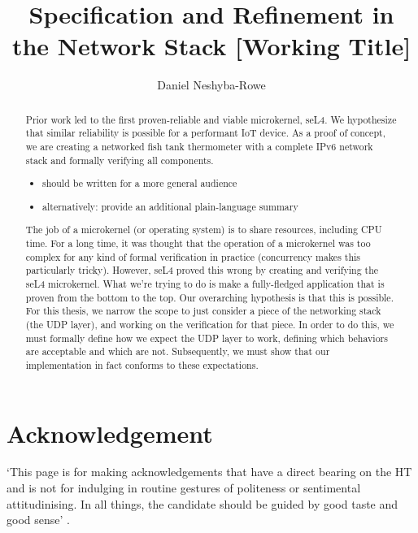 \documentclass[twoside]{memoir}
\title{Specification and Refinement in the Network Stack [Working Title]} %
\author{Daniel Neshyba-Rowe}
\begin{document}
\frontmatter


\maketitle

\chapter{Acknowledgement}
`This page is for making acknowledgements that have a direct bearing on the HT and is not for indulging in routine gestures of politeness or sentimental attitudinising. In all things, the candidate should be guided by good taste and good sense' . %

\begin{abstract}
        Prior work led to the first proven-reliable and viable microkernel, seL4.
      We hypothesize that similar reliability is possible for a performant IoT device.
      As a proof of concept, we are creating a networked fish tank thermometer
      with a complete IPv6 network stack and formally verifying all components.

      \begin{itemize}
          \item should be written for a more general audience
          \item alternatively: provide an additional plain-language summary
      \end{itemize}
      The job of a microkernel (or operating system) is to share resources, including CPU time.
      For a long time, it was thought that the operation of a microkernel was too complex for
      any kind of formal verification in practice (concurrency makes this particularly tricky).
      However, seL4 proved this wrong by creating and verifying the seL4 microkernel.
      What we're trying to do is make a fully-fledged application that is proven from the bottom to the top.
      Our overarching hypothesis is that this is possible.
      For this thesis, we narrow the scope to just consider a piece of the networking stack (the UDP layer), and working on the verification for that piece.
      In order to do this, we must formally define how we expect the UDP layer to work,
      defining which behaviors are acceptable and which are not.
      Subsequently, we must show that our implementation in fact conforms to these expectations.


\end{abstract}
\end{document}
